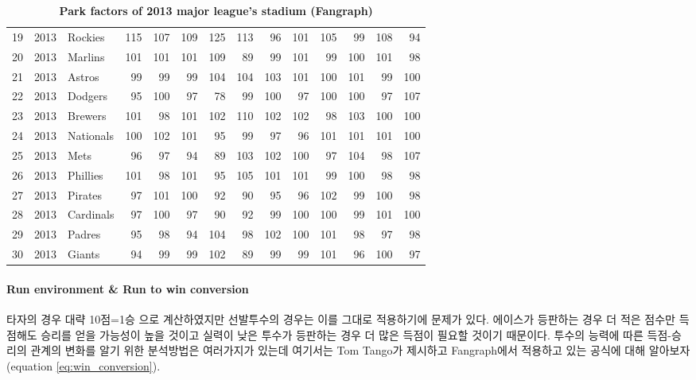 \documentclass[11pt]{article}
\begin{document}
\begin{table}
{\begin{tabular}{rrlrrrrrrrrrrr}
  19 & 2013 & Rockies & 115 & 107 & 109 & 125 & 113 &  96 & 101 & 105 &  99 & 108 &  94 \\ 
  20 & 2013 & Marlins & 101 & 101 & 101 & 109 &  89 &  99 & 101 &  99 & 100 & 101 &  98 \\ 
  21 & 2013 & Astros &  99 &  99 &  99 & 104 & 104 & 103 & 101 & 100 & 101 &  99 & 100 \\ 
  22 & 2013 & Dodgers &  95 & 100 &  97 &  78 &  99 & 100 &  97 & 100 & 100 &  97 & 107 \\ 
  23 & 2013 & Brewers & 101 &  98 & 101 & 102 & 110 & 102 & 102 &  98 & 103 & 100 & 100 \\ 
  24 & 2013 & Nationals & 100 & 102 & 101 &  95 &  99 &  97 &  96 & 101 & 101 & 101 & 100 \\ 
  25 & 2013 & Mets &  96 &  97 &  94 &  89 & 103 & 102 & 100 &  97 & 104 &  98 & 107 \\ 
  26 & 2013 & Phillies & 101 &  98 & 101 &  95 & 105 & 101 & 101 &  99 & 100 &  98 &  98 \\ 
  27 & 2013 & Pirates &  97 & 101 & 100 &  92 &  90 &  95 &  96 & 102 &  99 & 100 &  98 \\ 
  28 & 2013 & Cardinals &  97 & 100 &  97 &  90 &  92 &  99 & 100 & 100 &  99 & 101 & 100 \\ 
  29 & 2013 & Padres &  95 &  98 &  94 & 104 &  98 & 102 & 100 & 101 &  98 &  97 &  98 \\ 
  30 & 2013 & Giants &  94 &  99 &  99 & 102 &  89 &  99 &  99 & 101 &  96 & 100 &  97 \\ 
   \hline
\end{tabular}}
\caption{\textbf{Park factors of 2013 major league's stadium (Fangraph)}}
\end{table}

\paragraph{Run environment \& Run to win conversion}
타자의 경우 대략 10점=1승 으로 계산하였지만 선발투수의 경우는 이를 그대로 적용하기에 문제가 있다. 에이스가 등판하는 경우 더 적은 점수만 득점해도 승리를 얻을 가능성이 높을 것이고 실력이 낮은 투수가 등판하는 경우 더 많은 득점이 필요할 것이기 때문이다. 투수의 능력에 따른 득점-승리의 관계의 변화를 알기 위한 분석방법은 여러가지가 있는데 여기서는 Tom Tango가 제시하고 Fangraph에서 적용하고 있는 공식에 대해 알아보자\cite{winconversion}(equation \ref{eq:win_conversion}). 
\end{document}
